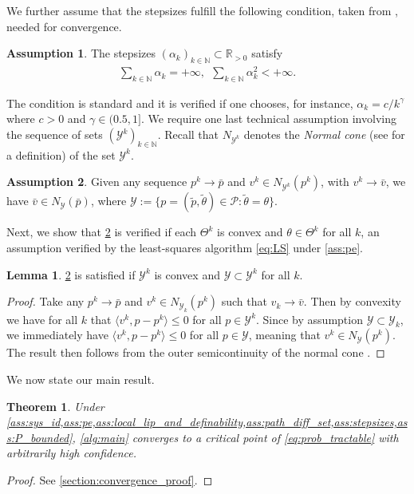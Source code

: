 \documentclass[journal,twoside,web,final]{ieeecolor}
\newtheorem{theorem}{Theorem}
\theoremstyle{definition}
\newtheorem{assumption}{Assumption}
\newtheorem{lemma}{Lemma}
\newcommand{\R}{\mathbb{R}}
\newcommand{\N}{\mathbb{N}}
\begin{document}
We further assume that the stepsizes fulfill the following condition, taken from \cite{davis2020stochastic}, needed for convergence.
\begin{assumption}\label{ass:stepsizes}
The stepsizes $( \alpha_k )_{k\in\N} \subset \R_{>0}$ satisfy
\begin{align*}
\sum_{k\in\N} \alpha_k = + \infty, ~~ \sum_{k\in\N} \alpha_k^2 < + \infty.
\end{align*}
\end{assumption}
%
The condition is standard and it is verified if one chooses, for instance, $\alpha_k = c / k^\gamma$ where $c>0$ and $\gamma\in(0.5,1]$.
We require one last technical assumption involving the sequence of sets $(\mathcal{Y}^k)_{k\in\N}$.
Recall that $N_{\mathcal{Y}^k}$ denotes the \emph{Normal cone} (see \cite[Page 201]{rockafellar2009variational} for a definition) of the set $\mathcal{Y}^k$.
%
\begin{assumption}\label{ass:outer_semi}
Given any sequence $p^k\to \bar{p}$ and $v^k\in N_{\mathcal{Y}^k}(p^k)$, with $v^k\to \bar{v}$, we have $\bar{v}\in N_\mathcal{Y}(\bar{p})$, where $\mathcal{Y}:=\{ p = (\tilde{p},\tilde{\theta}) \in \mathcal{P}: \tilde{\theta}=\theta \}$.
\end{assumption}
%
Next, we show that \cref{ass:outer_semi} is verified if each $\Theta^k$ is convex and $\theta \in \Theta^k$ for all $k$, 
an assumption verified by the least-squares algorithm \cref{eq:LS} under \cref{ass:pe}.
\begin{lemma}\label{lemma:convex_satisfies_outersemi}
\cref{ass:outer_semi} is satisfied if $\mathcal{Y}^k$ is convex and $\mathcal{Y} \subset \mathcal{Y}^k$ for all $k$.
\end{lemma}
\begin{proof}
Take any $p^k\to \bar{p}$ and $v^k\in N_{\mathcal{Y}_k}(p^k)$ such that $v_k\to \bar{v}$. 
Then by convexity we have for all $k$ that $\langle v^k, p-p^k \rangle \leq 0$ for all $p\in \mathcal{Y}^k$.
Since by assumption $\mathcal{Y} \subset \mathcal{Y}_k$, we immediately have $\langle v^k, p-p^k \rangle \leq 0$ for all $p\in \mathcal{Y}$,
meaning that $v^k \in N_\mathcal{Y}(p^k)$.
The result then follows from the outer semicontinuity of the normal cone \cite[Proposition 6.6]{rockafellar2009variational}.
\end{proof}

We now state our main result.
\begin{theorem}\label{thm:main}
Under \cref{ass:sys_id,ass:pe,ass:local_lip_and_definability,ass:path_diff_set,ass:stepsizes,ass:P_bounded}, \cref{alg:main} converges to a critical point of \cref{eq:prob_tractable} with arbitrarily high confidence.
\end{theorem}
\begin{proof}
See \cref{section:convergence_proof}.
\end{proof}
\end{document}
